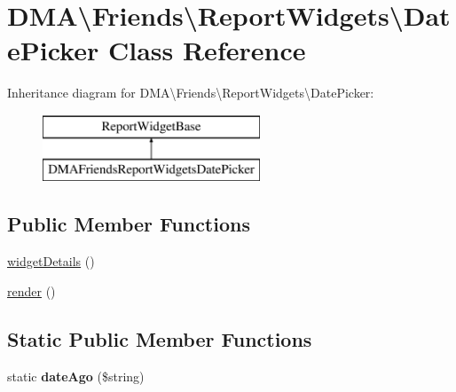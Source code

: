 \hypertarget{classDMA_1_1Friends_1_1ReportWidgets_1_1DatePicker}{}\section{D\+M\+A\textbackslash{}Friends\textbackslash{}Report\+Widgets\textbackslash{}Date\+Picker Class Reference}
\label{classDMA_1_1Friends_1_1ReportWidgets_1_1DatePicker}
Inheritance diagram for D\+M\+A\textbackslash{}Friends\textbackslash{}Report\+Widgets\textbackslash{}Date\+Picker\+:\begin{figure}[H]
\begin{center}
\leavevmode
\includegraphics[height=2.000000cm]{dc/def/classDMA_1_1Friends_1_1ReportWidgets_1_1DatePicker}
\end{center}
\end{figure}
\subsection*{Public Member Functions}
\begin{DoxyCompactItemize}
\item 
\hyperlink{classDMA_1_1Friends_1_1ReportWidgets_1_1DatePicker_a81ffeceeda18e18464689c36a03f541e}{widget\+Details} ()
\item 
\hyperlink{classDMA_1_1Friends_1_1ReportWidgets_1_1DatePicker_a3e9aff77509da20c6ba324e3ccdd3e9f}{render} ()
\end{DoxyCompactItemize}
\subsection*{Static Public Member Functions}
\begin{DoxyCompactItemize}
\item 
\hypertarget{classDMA_1_1Friends_1_1ReportWidgets_1_1DatePicker_a29f13e22b1bc28d919639ad7dcebaaa6}{}static {\bfseries date\+Ago} (\$string)\label{classDMA_1_1Friends_1_1ReportWidgets_1_1DatePicker_a29f13e22b1bc28d919639ad7dcebaaa6}

\end{DoxyCompactItemize}
